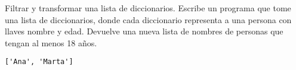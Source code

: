 \begin{exercise}
Filtrar y transformar una lista de diccionarios. Escribe un programa
que tome una lista de diccionarios, donde cada diccionario representa
a una persona con llaves nombre y edad. Devuelve una nueva lista de
nombres de personas que tengan al menos 18 años.

\begin{Shaded}
\begin{Highlighting}[]
     \NormalTok{(}
                \NormalTok{(}
                    \NormalTok{ persona: persona[}\NormalTok{], }
                    \NormalTok{(}
                        \NormalTok{ persona: persona[}\NormalTok{] }\OperatorTok{\textgreater{}=} \NormalTok{, }
\NormalTok{                    )}
\NormalTok{                )}
\NormalTok{            )}

\OperatorTok{=}\NormalTok{ [}
\NormalTok{    \{}\NormalTok{: }\NormalTok{, }\NormalTok{: }\NormalTok{\},}
\NormalTok{    \{}\NormalTok{: }\NormalTok{, }\NormalTok{: }\NormalTok{\},}
\NormalTok{    \{}\NormalTok{: }\NormalTok{, }\NormalTok{: }\NormalTok{\},}
\NormalTok{    \{}\NormalTok{: }\NormalTok{, }\NormalTok{: }\NormalTok{\}}
\NormalTok{]}
\OperatorTok{=}
\end{Highlighting}
\end{Shaded}

\begin{verbatim}
['Ana', 'Marta']

\end{verbatim}
\end{exercise}

